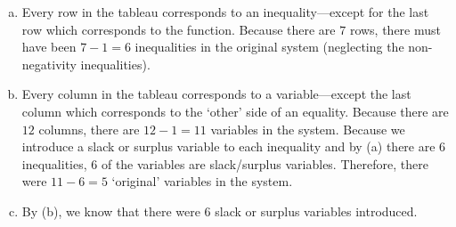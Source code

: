 \documentclass[11pt,letterpaper]{article}
\begin{document}
\sol 
\begin{enumerate}[(a)]
\item Every row in the tableau corresponds to an inequality---except for the last row which corresponds to the function. Because there are $7$ rows, there must have been $7 - 1= 6$ inequalities in the original system (neglecting the non-negativity inequalities). 

\item Every column in the tableau corresponds to a variable---except the last column which corresponds to the `other' side of an equality. Because there are $12$ columns, there are $12 - 1= 11$ variables in the system. Because we introduce a slack or surplus variable to each inequality and by (a) there are $6$ inequalities, $6$ of the variables are slack/surplus variables. Therefore, there were $11 - 6= 5$ `original' variables in the system. 

\item By (b), we know that there were $6$ slack or surplus variables introduced. 


\end{enumerate}
\end{document}

